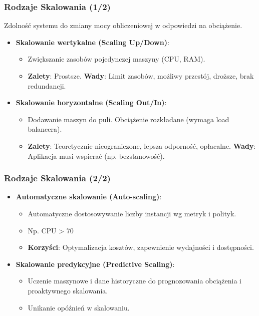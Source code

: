 \documentclass[aspectratio=169,xcolor=table]{beamer}
\begin{document}
\begin{frame}
  \frametitle{Rodzaje Skalowania (1/2)}
  Zdolność systemu do zmiany mocy obliczeniowej w odpowiedzi na obciążenie.
  \begin{itemize}
    \item \textbf{Skalowanie wertykalne (Scaling Up/Down)}:
        \begin{itemize}
            \item Zwiększanie zasobów pojedynczej maszyny (CPU, RAM).
            \item \textbf{Zalety}: Prostsze. \textbf{Wady}: Limit zasobów, możliwy przestój, droższe, brak redundancji.
        \end{itemize}
    \item \textbf{Skalowanie horyzontalne (Scaling Out/In)}:
        \begin{itemize}
            \item Dodawanie maszyn do puli. Obciążenie rozkładane (wymaga load balancera).
            \item \textbf{Zalety}: Teoretycznie nieograniczone, lepsza odporność, opłacalne. \textbf{Wady}: Aplikacja musi wspierać (np. bezstanowość).
        \end{itemize}
  \end{itemize}
\end{frame}

\begin{frame}
  \frametitle{Rodzaje Skalowania (2/2)}
  \begin{itemize}
    \item \textbf{Automatyczne skalowanie (Auto-scaling)}:
        \begin{itemize}
            \item Automatyczne dostosowywanie liczby instancji wg metryk i polityk.
            \item Np. CPU > 70%
            \item \textbf{Korzyści}: Optymalizacja kosztów, zapewnienie wydajności i dostępności.
        \end{itemize}
    \item \textbf{Skalowanie predykcyjne (Predictive Scaling)}:
        \begin{itemize}
            \item Uczenie maszynowe i dane historyczne do prognozowania obciążenia i proaktywnego skalowania.
            \item Unikanie opóźnień w skalowaniu.
        \end{itemize}
  \end{itemize}
\end{frame}
\end{document}
